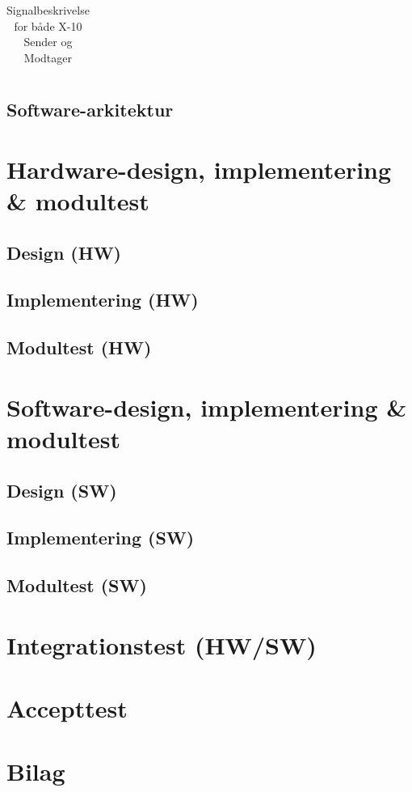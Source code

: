 \documentclass[11pt]{article}
\begin{document}
\begin{table}[H]
\begin{tabularx}{\textwidth}{X|p{4cm}|X|p{2.9cm}|p{2.9cm}|X}
	\end{tabularx}
	\caption{Signalbeskrivelse for både X-10 Sender og Modtager}
	\label{tab: signalbeskrivelse}
\end{table}




\subsection{Software-arkitektur}

\vfill
\pagebreak

\section{Hardware-design, implementering \& modultest}
\subsection{Design (HW)}
\subsection{Implementering (HW)}
\subsection{Modultest (HW)}
\vfill
\pagebreak

\section{Software-design, implementering \& modultest}
\subsection{Design (SW)}
\subsection{Implementering (SW)}
\subsection{Modultest (SW)}
\vfill
\pagebreak

\section{Integrationstest (HW/SW)}
\vfill
\pagebreak

\section{Accepttest}
\vfill
\pagebreak

\section{Bilag}
\vfill
\pagebreak
\end{document}
